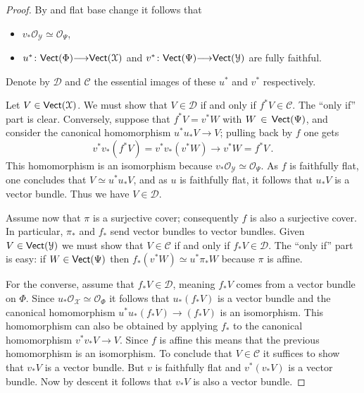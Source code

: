 \documentclass[12pt,reqno]{amsart}
\theoremstyle{plain}
\theoremstyle{definition}
\numberwithin{thm}{section}
\newcounter{x}\setcounter{x}{1}
\theoremstyle{plain}
\begin{document}
\begin{proof}
By \cite[Lemma 7.17]{BV} and flat base change it follows that 
\begin{itemize}
\item $v_*{\mathcal{O}_{\mathcal{Y}}}\simeq{\mathcal{O}_{\Psi}}$,

\item $u^*\colon{\text{\sf Vect}}(\Phi){\longrightarrow}{\text{\sf Vect}}({\mathcal{X}})$ and 
$v^*\colon{\text{\sf Vect}}(\Psi){\longrightarrow}{\text{\sf Vect}}({\mathcal{Y}})$ are fully faithful.
\end{itemize}
Denote by ${\mathcal{D}}$ and ${\mathcal{C}}$ the essential images of these $u^*$ and $v^*$ respectively.
 
Let $V\in{\text{\sf Vect}}({\mathcal{X}})$. We must show that $V\in {\mathcal{D}}$ if and only if $f^*V\in 
{\mathcal{C}}$. The ``only if'' part is clear. Conversely, suppose that $f^* V= v^* W$ with
$W \,\in \, {\text{\sf Vect}}(\Psi )$, and consider the
canonical homomorphism $u^* u_* V {\longrightarrow} V$; pulling back by $f$ one 
gets $$v^*v_*(f^*V) =v^*v_*(v^*W) {\longrightarrow} v^*W=f^*V\, .$$ This
homomorphism is an isomorphism because
$v_* {\mathcal{O}_{\mathcal{Y}}} \simeq {\mathcal{O}} _\Psi$. As $f$ is faithfully flat, one concludes that $V 
\simeq u^*u_* V$, and as $u$ is faithfully flat, it follows that $u_*V$ is a 
vector bundle. Thus we have $V\in{\mathcal{D}}$.

Assume now that $\pi$ is a surjective cover;
consequently $f$ is also a surjective cover. In particular, $\pi_*$ and $f_*$
send vector bundles to vector bundles. Given $V\in{\text{\sf Vect}}({\mathcal{Y}})$ we must show that $V\in {\mathcal{C}}$ if and only if $f_*V\in{\mathcal{D}}$. 
The ``only if'' part is easy: if $W\in {\text{\sf Vect}}(\Psi)$ then $f_*(v^*W)\simeq u^*\pi_*W$
because $\pi$ is affine.

For the converse, assume that $f_*V\in {\mathcal{D}}$, meaning 
$f_*V$ comes from a vector bundle on $\Phi$. Since $u_*{\mathcal{O}_{\mathcal{X}}}\simeq 
{\mathcal{O}_{\Phi}}$ it follows that $u_*(f_*V)$ is a vector bundle and the canonical
homomorphism $u^*u_* 
(f_*V) {\longrightarrow} (f_*V)$ is an isomorphism. This homomorphism can also be obtained
by applying 
$f_*$ to the canonical homomorphism $v^*v_*V{\longrightarrow} V$. Since $f$ is affine this means that 
the previous homomorphism is an isomorphism. To conclude that $V\in {\mathcal{C}}$ it
suffices to 
show that $v_*V$ is a vector bundle. But $v$ is faithfully flat and $v^*(v_*V)$ is
a vector bundle. Now by descent it follows that $v_*V$ is also a vector bundle.
\end{proof}
\end{document}
